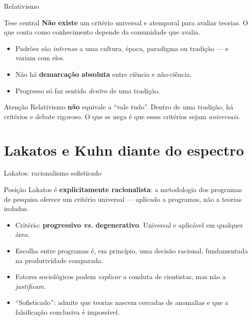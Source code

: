 \documentclass[aspectratio=169]{beamer}
\newcommand{\impt}[1]{\textcolor{maccent}{\textbf{#1}}}
\newcommand{\ntc}[1]{\textcolor{mprimary}{#1}}
\begin{document}
\begin{frame}{Relativismo}
\begin{block}{Tese central}
\impt{N\~ao existe} um crit\'erio universal e atemporal para avaliar teorias. O que conta como conhecimento depende da comunidade que avalia.
\end{block}
\vspace{0.3cm}
\begin{itemize}
    \item Padr\~oes s\~ao \emph{internos} a uma cultura, \'epoca, paradigma ou tradi\c c\~ao --- e variam com eles.
    \item N\~ao h\'a \impt{demarca\c c\~ao absoluta} entre ci\^encia e n\~ao-ci\^encia.
    \item Progresso s\'o faz sentido \emph{dentro} de uma tradi\c c\~ao.
\end{itemize}
\vspace{0.3cm}
\begin{alertblock}{Aten\c c\~ao}
Relativismo \impt{n\~ao} equivale a ``vale tudo''. Dentro de uma tradi\c c\~ao, h\'a crit\'erios e debate rigoroso. O que se nega \'e que esses crit\'erios sejam \emph{universais}.
\end{alertblock}
\end{frame}


\section{Lakatos e Kuhn diante do espectro}

\begin{frame}{Lakatos: racionalismo sofisticado}
\begin{block}{Posi\c c\~ao}
Lakatos \'e \impt{explicitamente racionalista}: a metodologia dos programas de pesquisa oferece um crit\'erio universal --- aplicado a programas, n\~ao a teorias isoladas.
\end{block}
\vspace{0.3cm}
\begin{itemize}
    \item Crit\'erio: \impt{progressivo \emph{vs.} degenerativo}. Universal e aplic\'avel em qualquer \'area.
    \item Escolha entre programas \'e, em princ\'ipio, uma decis\~ao \ntc{racional}, fundamentada na produtividade comparada.
    \item Fatores sociol\'ogicos podem \emph{explicar} a conduta de cientistas, mas n\~ao a \emph{justificam}.
\end{itemize}
\vspace{0.2cm}
\begin{itemize}
    \item \ntc{``Sofisticado''}: admite que teorias nascem cercadas de anomalias e que a falsifica\c c\~ao conclusiva \'e imposs\'ivel.
\end{itemize}
\end{frame}
\end{document}
